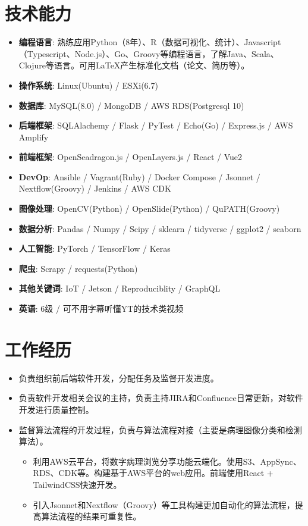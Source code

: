 \documentclass{resume}
\begin{document}
\section{技术能力}
\begin{itemize}[parsep=0.2ex]
  \item \textbf{编程语言}: 熟练应用Python（8年）、R（数据可视化、统计）、Javascript（Typescript、Node.js）、Go、Groovy等编程语言，了解Java、Scala、Clojure等语言。可用\LaTeX{}产生标准化文档（论文、简历等）。
  \item \textbf{操作系统}: Linux(Ubuntu) / ESXi(6.7)
  \item \textbf{数据库}: MySQL(8.0) / MongoDB / AWS RDS(Postgresql 10)
  \item \textbf{后端框架}: SQLAlachemy / Flask / PyTest / Echo(Go) / Express.js / AWS Amplify
  \item \textbf{前端框架}: OpenSeadragon.js / OpenLayers.js / React / Vue2
  \item \textbf{DevOp}: Ansible / Vagrant(Ruby) / Docker Compose / Jsonnet / Nextflow(Groovy) / Jenkins / AWS CDK
  \item \textbf{图像处理}: OpenCV(Python) / OpenSlide(Python) / QuPATH(Groovy)
  \item \textbf{数据分析}: Pandas / Numpy / Scipy / sklearn / tidyverse / ggplot2 / seaborn
  \item \textbf{人工智能}: PyTorch / TensorFlow / Keras
  \item \textbf{爬虫}: Scrapy / requests(Python)
  \item \textbf{其他关键词}: IoT / Jetson / Reproduciblity / GraphQL
  \item \textbf{英语}: 6级 / 可不用字幕听懂YT的技术类视频
\end{itemize}


\section{工作经历}
\begin{itemize}
  \item 负责组织前后端软件开发，分配任务及监督开发进度。
  \item 负责软件开发相关会议的主持，负责主持JIRA和Confluence日常更新，对软件开发进行质量控制。
  \item 监督算法流程的开发过程，负责与算法流程对接（主要是病理图像分类和检测算法）。
    \begin{itemize}
    \item 利用AWS云平台，将数字病理浏览分享功能云端化。使用S3、AppSync、RDS、CDK等。构建基于AWS平台的web应用。前端使用React + TailwindCSS快速开发。
    \item 引入Jsonnet和Nextflow（Groovy）等工具构建更加自动化的算法流程，提高算法流程的结果可重复性。
    \end{itemize}
\end{itemize}
\end{document}
